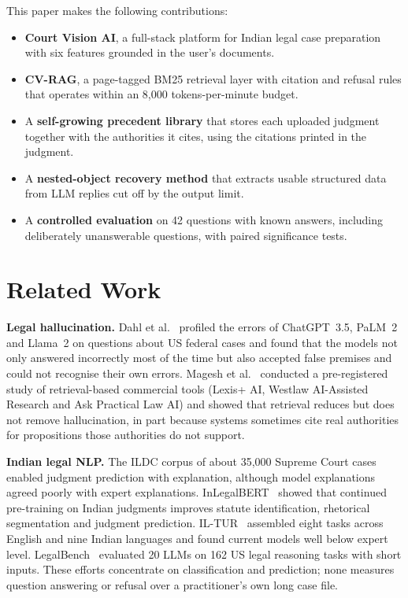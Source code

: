 \documentclass[conference]{IEEEtran}
\begin{document}
This paper makes the following contributions:
\begin{itemize}
\item \textbf{Court Vision AI}, a full-stack platform for Indian legal case preparation with six features grounded in the user's documents.
\item \textbf{CV-RAG}, a page-tagged BM25 retrieval layer with citation and refusal rules that operates within an 8,000 tokens-per-minute budget.
\item A \textbf{self-growing precedent library} that stores each uploaded judgment together with the authorities it cites, using the citations printed in the judgment.
\item A \textbf{nested-object recovery method} that extracts usable structured data from LLM replies cut off by the output limit.
\item A \textbf{controlled evaluation} on 42 questions with known answers, including deliberately unanswerable questions, with paired significance tests.
\end{itemize}

\section{Related Work}
\textbf{Legal hallucination.} Dahl et al.~\cite{dahl2024} profiled the errors of ChatGPT~3.5, PaLM~2 and Llama~2 on questions about US federal cases and found that the models not only answered incorrectly most of the time but also accepted false premises and could not recognise their own errors. Magesh et al.~\cite{magesh2025} conducted a pre-registered study of retrieval-based commercial tools (Lexis+ AI, Westlaw AI-Assisted Research and Ask Practical Law AI) and showed that retrieval reduces but does not remove hallucination, in part because systems sometimes cite real authorities for propositions those authorities do not support.

\textbf{Indian legal NLP.} The ILDC corpus of about 35,000 Supreme Court cases~\cite{malik2021ildc} enabled judgment prediction with explanation, although model explanations agreed poorly with expert explanations. InLegalBERT~\cite{paul2023inlegalbert} showed that continued pre-training on Indian judgments improves statute identification, rhetorical segmentation and judgment prediction. IL-TUR~\cite{joshi2024iltur} assembled eight tasks across English and nine Indian languages and found current models well below expert level. LegalBench~\cite{guha2023legalbench} evaluated 20 LLMs on 162 US legal reasoning tasks with short inputs. These efforts concentrate on classification and prediction; none measures question answering or refusal over a practitioner's own long case file.
\end{document}
